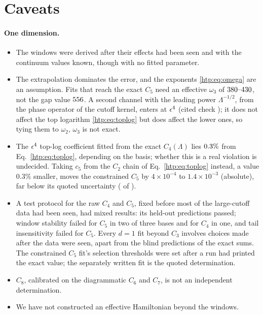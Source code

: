 \section{Caveats}\label{htp:sec:caveats}

\paragraph{One dimension.}
\begin{itemize}
\item The windows were derived after their effects had been seen and with the continuum values known, though with no
 fitted parameter.
\item The extrapolation dominates the error, and the exponents \eqref{htp:eq:omega} are an assumption. Fits that reach the
 exact $C_5$ need an effective $\omega_3$ of $380\text{--}430$, not the gap value $556$. A second channel
 with the leading power $\Lambda^{-1/2}$, from the phase operator of the cutoff kernel, enters at $\epsilon^4$ (cited check
 ); it does not affect the top logarithm \eqref{htp:eq:toplog} but does affect
 the lower ones, so tying them to $\omega_2$, $\omega_3$ is not exact.
\item The $\epsilon^4$ top-log coefficient fitted from the exact $C_4(\Lambda)$ lies $0.3\%$ from
 Eq.~\eqref{htp:eq:toplog}, depending on the basis; whether this is a real violation is undecided. Taking $c_5$ from the
 $C_2$ chain of Eq.~\eqref{htp:eq:toplog} instead, a value $0.3\%$ smaller, moves the constrained $C_5$ by $4\times10^{-4}$ to
 $1.4\times10^{-3}$ (absolute), far below its quoted uncertainty ( of ).
\item A test protocol for the raw $C_4$ and $C_5$, fixed before most of the large-cutoff data had been seen, had mixed
 results: its held-out predictions passed; window stability failed for $C_5$ in two of three bases and for $C_4$ in one,
 and tail insensitivity failed for $C_5$. Every $d=1$ fit beyond $C_3$ involves choices made after the data were seen, apart from the blind
 predictions of the exact sums. The constrained $C_5$ fit's selection thresholds were set after a run had printed the
 exact value; the separately written fit is the quoted determination.
\item $C_8$, calibrated on the diagrammatic $C_6$ and $C_7$, is not an independent determination.
\item We have not constructed an effective Hamiltonian beyond the windows.
\end{itemize}
